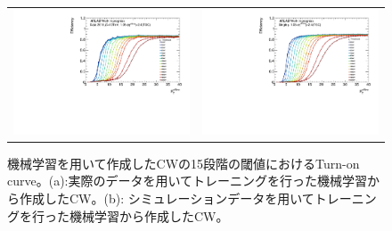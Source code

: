 \begin{figure}
    \begin{tabular}{cc}
    \begin{minipage}[b]{0.45\hsize}
        \hspace*{-1cm}
        \includegraphics[clip, width=8cm]{fig/5/15_v06_Data.pdf}
        \subcaption{}
        \label{fig:15Eff_CW_Data}
    \end{minipage}&
    \begin{minipage}[b]{0.45\hsize}
        \includegraphics[clip, width=8cm]{fig/5/15_MC_MC.pdf}
        \subcaption{}
        \label{fig:15Eff_CW_Simu}
    \end{minipage}
    \end{tabular}
    \caption{機械学習を用いて作成したCWの15段階の閾値におけるTurn-on curve。(a):実際のデータを用いてトレーニングを行った機械学習から作成したCW。(b): シミュレーションデータを用いてトレーニングを行った機械学習から作成したCW。}
    \label{}
\end{figure}

